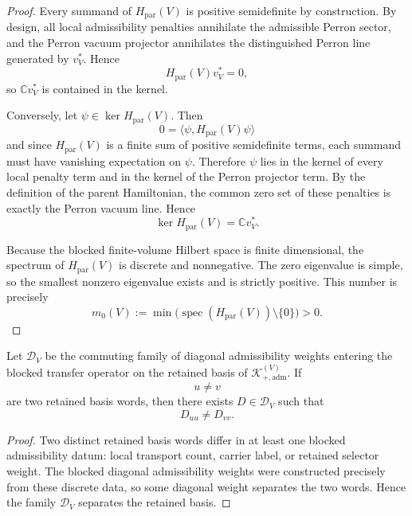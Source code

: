 \begin{proof}
Every summand of $H_{\mathrm{par}}(V)$ is positive semidefinite by construction. By design, all
local admissibility penalties annihilate the admissible Perron sector, and the Perron vacuum
projector annihilates the distinguished Perron line generated by $v_V^*$. Hence
\[
H_{\mathrm{par}}(V)v_V^*=0,
\]
so $\mathbb C v_V^*$ is contained in the kernel.

Conversely, let $\psi\in\ker H_{\mathrm{par}}(V)$. Then
\[
0=\langle \psi,H_{\mathrm{par}}(V)\psi\rangle
\]
and since $H_{\mathrm{par}}(V)$ is a finite sum of positive semidefinite terms, each summand must
have vanishing expectation on $\psi$. Therefore $\psi$ lies in the kernel of every local penalty
term and in the kernel of the Perron projector term. By the definition of the parent Hamiltonian,
the common zero set of these penalties is exactly the Perron vacuum line. Hence
\[
\ker H_{\mathrm{par}}(V)=\mathbb C v_V^*.
\]

Because the blocked finite-volume Hilbert space is finite dimensional, the spectrum of
$H_{\mathrm{par}}(V)$ is discrete and nonnegative. The zero eigenvalue is simple, so the smallest
nonzero eigenvalue exists and is strictly positive. This number is precisely
\[
m_0(V):=\min\bigl(\operatorname{spec}(H_{\mathrm{par}}(V))\setminus\{0\}\bigr)>0.
\]
\end{proof}

\begin{lemma}
\label{lem:diagonal-weights-separate-basis}
Let $\mathcal D_V$ be the commuting family of diagonal admissibility weights entering the blocked
transfer operator on the retained basis of $\mathcal K_{+,\mathrm{adm}}^{(V)}$. If
\[
u\neq v
\]
are two retained basis words, then there exists $D\in\mathcal D_V$ such that
\[
D_{uu}\neq D_{vv}.
\]
\end{lemma}

\begin{proof}
Two distinct retained basis words differ in at least one blocked admissibility datum: local
transport count, carrier label, or retained selector weight. The blocked diagonal admissibility
weights were constructed precisely from these discrete data, so some diagonal weight separates the
two words. Hence the family $\mathcal D_V$ separates the retained basis.
\end{proof}


